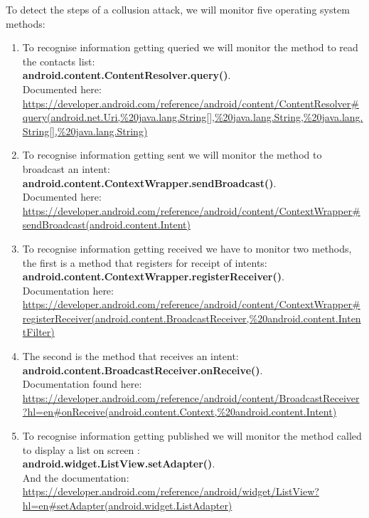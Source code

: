 \noindent To detect the steps of a collusion attack, we will monitor five operating system methods:

\begin{enumerate}
\item To recognise information getting queried we will monitor the method to read the contacts list:\\
\textbf{android.content.ContentResolver.query()}.\\
Documented here:\\
\url{https://developer.android.com/reference/android/content/ContentResolver#query(android.net.Uri,\%20java.lang.String[],\%20java.lang.String,\%20java.lang.String[],\%20java.lang.String)}

\item To recognise information getting sent we will monitor the method to broadcast an intent:\\
\textbf{android.content.ContextWrapper.sendBroadcast()}.\\
Documented here:\\
\url{https://developer.android.com/reference/android/content/ContextWrapper#sendBroadcast(android.content.Intent)}

\item To recognise information getting received we have to monitor two methods, the first is a method that registers for receipt of intents:\\
\textbf{android.content.ContextWrapper.registerReceiver()}.\\
Documentation here:\\
\url{https://developer.android.com/reference/android/content/ContextWrapper#registerReceiver(android.content.BroadcastReceiver,\%20android.content.IntentFilter)}

\item The second is the method that receives an intent:\\
\textbf{android.content.BroadcastReceiver.onReceive()}.\\
Documentation found here:\\
\url{https://developer.android.com/reference/android/content/BroadcastReceiver?hl=en#onReceive(android.content.Context,\%20android.content.Intent)}

\item To recognise information getting published we will monitor the method called to display a list on screen :\\
\textbf{android.widget.ListView.setAdapter()}.\\
And the documentation:\\
\url{https://developer.android.com/reference/android/widget/ListView?hl=en#setAdapter(android.widget.ListAdapter)}
\end{enumerate}


